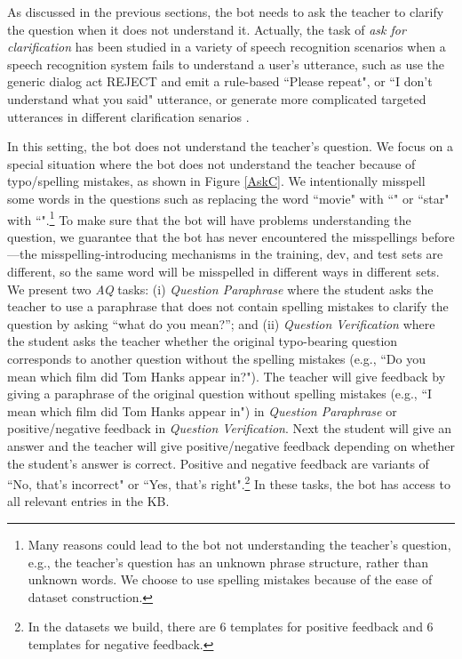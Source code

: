 As discussed in the previous sections, the bot needs to ask the teacher to clarify the question when it does not understand it. 
Actually, the task of {\it ask for clarification} has been studied in a variety of speech recognition 
scenarios
when a speech recognition system fails to understand a user's utterance, such as
use the generic dialog act REJECT and emit a rule-based ``Please repeat",
or ``I don't understand what you said" utterance, or generate more complicated targeted utterances
in different clarification senarios
 \cite{purver2004theory,nerbonne2005interrogative,stoyanchev2015localized}. 

In this setting, the bot does not understand the teacher's question. We focus on a
special situation where the bot does not understand the teacher because of typo/spelling mistakes,
 as shown in Figure \ref{AskC}.
We intentionally misspell some words in the questions such as replacing the word ``movie" with
``{\color{brown}{movvie}}" or ``star" with  ``{\color{brown}{sttar}}".\footnote{Many
reasons could lead to the bot not understanding the teacher's question, e.g.,
the teacher's question has an unknown phrase structure, rather than unknown words.
We choose to use spelling mistakes because of the ease of dataset construction.}
To make sure that the bot will have problems understanding the question, we guarantee that the bot
has never encountered the misspellings before---the misspelling-introducing mechanisms
in the training, dev, and test sets are different, so the same word will be misspelled in different ways in different sets.
We present two {\it AQ} tasks:
(i) {\it Question Paraphrase} where the student asks the teacher to use a paraphrase that
does not contain spelling mistakes to clarify the question by asking ``what do you mean?'';
and (ii) {\it Question Verification} where the student  asks the teacher
whether the original typo-bearing question corresponds to another question
without the spelling mistakes (e.g., ``Do you mean which film did Tom Hanks appear in?").
The teacher will give
feedback by giving a paraphrase of the original question without spelling mistakes
(e.g., ``I mean which film did Tom Hanks appear in") in {\it Question Paraphrase}
or positive/negative feedback in {\it Question Verification}.
Next the student will give an answer and the teacher will give positive/negative
feedback depending on whether the student's answer is correct.
Positive and negative feedback are variants of ``No, that's incorrect" or
``Yes, that's right".\footnote{In the datasets we build, there are 6 templates
for positive feedback and 6 templates for negative feedback.}
In these tasks, the bot has access to all relevant entries in the KB.

